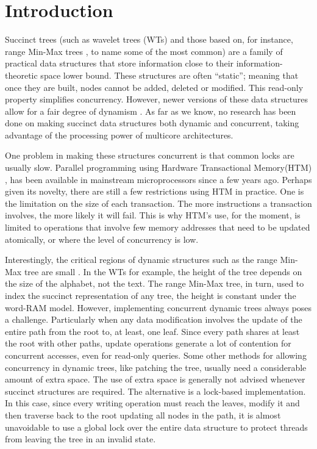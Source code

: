 \documentclass{llncs}
\begin{document}
\section{Introduction}
\vspace{-4mm}
Succinct trees (such as wavelet trees (WTs) \cite{wtfa:gnavarro} and those based on, for instance, range Min-Max trees \cite{Navarro:2014:FFS:2620785.2601073}, to name some of the most common) are a family of practical data structures that store information close to their information-theoretic space lower bound. These structures are often ``static''; meaning that once they are built, nodes cannot be added, deleted or modified. This read-only property simplifies concurrency. However, newer versions of these data structures allow for a fair degree of dynamism \cite{Navarro:2014:FFS:2620785.2601073}. As far as we know, no research has been done on making succinct data structures both dynamic and concurrent, taking advantage of the processing power of multicore architectures.

One problem in making these structures concurrent is that common locks are usually slow. Parallel programming using Hardware Transactional Memory(HTM) \cite{Herlihy:1993:TMA:165123.165164}, has been available in mainstream microprocessors since a few years ago. Perhaps given its novelty, there are still a few restrictions using HTM in practice. One is the limitation on the size of each transaction. The more instructions a transaction involves, the more likely it will fail. This is why HTM's use, for the moment, is limited to operations that involve few memory addresses that need to be updated atomically, or where the level of concurrency is low.
 
Interestingly, the critical regions of dynamic structures such as the range Min-Max tree are small \cite{DBLP:conf/wea/SepulvedaEFS14,Ferres2015}. In the WTs for example, the height of the tree depends on the size of the alphabet, not the text. The range Min-Max tree, in turn, used to index the succinct representation of any tree, the height is constant under the word-RAM model. However, implementing concurrent dynamic trees always poses a challenge. Particularly when any data modification involves the update of the entire path from the root to, at least, one leaf. Since every path shares at least the root with other paths, update operations generate a lot of contention for concurrent accesses, even for read-only queries. Some other methods for allowing concurrency in dynamic trees, like patching the tree, usually need a considerable amount of extra space. The use of extra space is generally not advised whenever succinct structures are required. The alternative is a lock-based implementation. In this case, since every writing operation must reach the leaves, modify it and then traverse back to the root updating all nodes in the path, it is almost unavoidable to use a global lock over the entire data structure to protect threads from leaving the tree in an invalid state.
\end{document}
